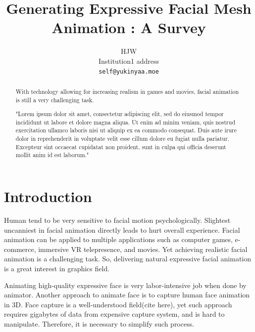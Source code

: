 \documentclass[10pt,twocolumn,letterpaper]{article}
\begin{document}
\title{Generating Expressive Facial Mesh Animation : A Survey}

\author{
HJW\\
Institution1 address\\
{\tt\small self@yukinyaa.moe}
}
\maketitle

\begin{abstract}
With technology allowing for increasing realism in games and movies, facial animation is still a very challenging task. 

"Lorem ipsum dolor sit amet, consectetur adipiscing elit, sed do eiusmod tempor incididunt ut labore et dolore magna aliqua. Ut enim ad minim veniam, quis nostrud exercitation ullamco laboris nisi ut aliquip ex ea commodo consequat. Duis aute irure dolor in reprehenderit in voluptate velit esse cillum dolore eu fugiat nulla pariatur. Excepteur sint occaecat cupidatat non proident, sunt in culpa qui officia deserunt mollit anim id est laborum."
\end{abstract}

\section{Introduction}
\label{sec:intro}

Human tend to be very sensitive to facial motion psychologically. Slightest uncanniest in facial animation directly leads to hurt overall experience\cite{hansonUpendingUncannyValley}. Facial animation can be applied to multiple applications such as computer games, e-commerce, immersive VR telepresence, and movies. Yet achieving realistic facial animation is a challenging task. So, delivering natural expressive facial animation is a great interest in graphics field.

Animating high-quality expressive face is very labor-intensive job when done by animator. Another approach to animate face is to capture human face animation in 3D. Face capture is a well-understood field(cite here), yet such approach requires gigabytes of data from expensive capture system, and is hard to manipulate. Therefore, it is necessary to simplify such process. 
\end{document}
